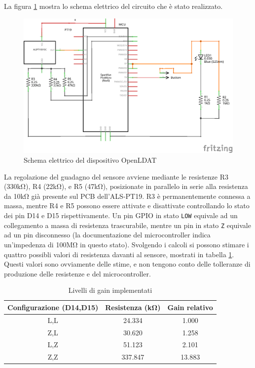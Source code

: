 La figura \ref{fig:circuit} mostra lo schema elettrico del circuito che è stato realizzato.
\begin{figure}[h]
	\centering
	\includegraphics[width=\textwidth]{Chapter03/res/openldat_circuit.png}
	\caption{Schema elettrico del dispositivo OpenLDAT}
	\label{fig:circuit}
\end{figure}

La regolazione del guadagno del sensore avviene mediante le resistenze R3 (330k\si{\ohm}), R4 (22k\si{\ohm}), e R5 (47k\si{\ohm}), posizionate in parallelo in serie alla resistenza da 10k\si{\ohm} già presente sul PCB dell'ALS-PT19. R3 è permanentemente connessa a massa, mentre R4 e R5 possono essere attivate e disattivate controllando lo stato dei pin D14 e D15 rispettivamente. Un pin GPIO in stato \texttt{LOW} equivale ad un collegamento a massa di resistenza trascurabile, mentre un pin in stato \texttt{Z} equivale ad un pin disconnesso (la documentazione del microcontroller indica un'impedenza di 100M\si{\ohm} in questo stato). Svolgendo i calcoli si possono stimare i quattro possibli valori di resistenza davanti al sensore, mostrati in tabella \ref{tab:pt19_gains}. Questi valori sono ovviamente delle stime, e non tengono conto delle tolleranze di produzione delle resistenze e del microcontroller.
\begin{table}
	\centering
	\begin{tabular}{|c|c|c|} 
		\hline
		\textbf{Configurazione (D14,D15)} & \textbf{Resistenza (k\si{\ohm})} & \textbf{Gain relativo}  \\ 
		\hline
		L,L & 24.334   & 1.000         \\ 
		\hline
		Z,L & 30.620   & 1.258         \\ 
		\hline
		L,Z & 51.123   & 2.101         \\ 
		\hline
		Z,Z & 337.847    & 13.883          \\
		\hline
	\end{tabular}
	\caption{\label{tab:pt19_gains}Livelli di gain implementati}
\end{table}

